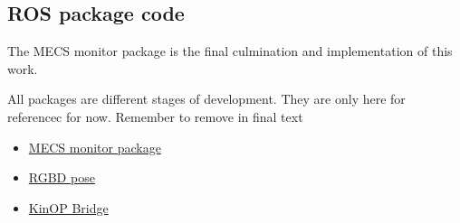 \begin{appendices}
  \chapter{ROS package code}

  The MECS monitor package is the final culmination and implementation of this work.
  
  {\color{red}All packages are different stages of development. They are only here for referencec for now. Remember to remove in final text}
  \begin{itemize}
  \item\href{https://github.com/baardkrk/mecs_monitor}{MECS monitor package}
  \item\href{https://github.com/baardkrk/rgbd_pose}{RGBD pose}
  \item\href{https://github.com/baardkrk/kinop_bridge}{KinOP Bridge}
  \end{itemize}
\end{appendices}
